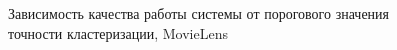 \documentclass[a4paper, 12pt]{article} %
\begin{document}
	
	\begin{figure}[h!]
	\begin{minipage}[h]{0.49\linewidth}
	\end{minipage}
	\hfill
	\begin{minipage}[H]{0.49\linewidth}
	\end{minipage}
	\caption{Зависимость качества работы системы от порогового значения точности кластеризации, MovieLens}
	\label{fig:movielens_accuraccur}
	\end{figure}
	
\end{document}
